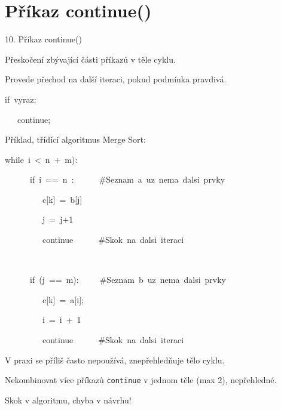 \documentclass[czech]{beamer}
\newenvironment{lyxcode}
  {\par\begin{list}{}{
    \setlength{\rightmargin}{\leftmargin}
    \setlength{\listparindent}{0pt}%
    \raggedright
    \setlength{\itemsep}{0pt}
    \setlength{\parsep}{0pt}
    \normalfont\ttfamily}%
   \def\{{\char`\{}
   \def\}{\char`\}}
   \def\textasciitilde{\char`\~}
   \item[]}
  {\end{list}}
\begin{document}
\section{Příkaz continue()}
\begin{frame}[plain]{10. Příkaz continue()}

{\footnotesize Přeskočení zbývající části příkazů v těle cyklu.}{\footnotesize\par}

{\footnotesize Provede přechod na další iteraci, pokud podmínka pravdivá.}{\footnotesize\par}
\begin{lyxcode}
{\footnotesize if~vyraz:}{\footnotesize\par}

{\footnotesize ~~~continue;}{\footnotesize\par}
\end{lyxcode}
{\footnotesize Příklad, třídící algoritmus Merge Sort:}{\footnotesize\par}
\begin{lyxcode}
{\footnotesize while~i~<~n~+~m):}{\footnotesize\par}

{\footnotesize ~~~~~~if~i~==~n~:~~~~~~\#Seznam~a~uz~nema~dalsi~prvky}{\footnotesize\par}

{\footnotesize ~~~~~~~~~c{[}k{]}~=~b{[}j{]}}{\footnotesize\par}

{\footnotesize ~~~~~~~~~j~=~j+1}{\footnotesize\par}

{\footnotesize ~~~~~~~~~continue~~~~~~\#Skok~na~dalsi~iteraci}{\footnotesize\par}

{\footnotesize ~~~~~~}{\footnotesize\par}

{\footnotesize ~~~~~~if~(j~==~m):~~~~~\#Seznam~b~uz~nema~dalsi~prvky}{\footnotesize\par}

{\footnotesize ~~~~~~~~~c{[}k{]}~=~a{[}i{]};}{\footnotesize\par}

{\footnotesize ~~~~~~~~~i~=~i~+~1}{\footnotesize\par}

{\footnotesize ~~~~~~~~~continue~~~~~~\#Skok~na~dalsi~iteraci}{\footnotesize\par}
\end{lyxcode}
{\footnotesize V praxi se příliš často nepoužívá, znepřehledňuje tělo
cyklu.\bigskip{}
}{\footnotesize\par}

{\footnotesize Nekombinovat více příkazů }{\footnotesize\texttt{continue}}{\footnotesize{}
v jednom těle (max 2), nepřehledné.\bigskip{}
}{\footnotesize\par}

{\footnotesize Skok v algoritmu, chyba v návrhu!}{\footnotesize\par}
\end{frame}
\end{document}
